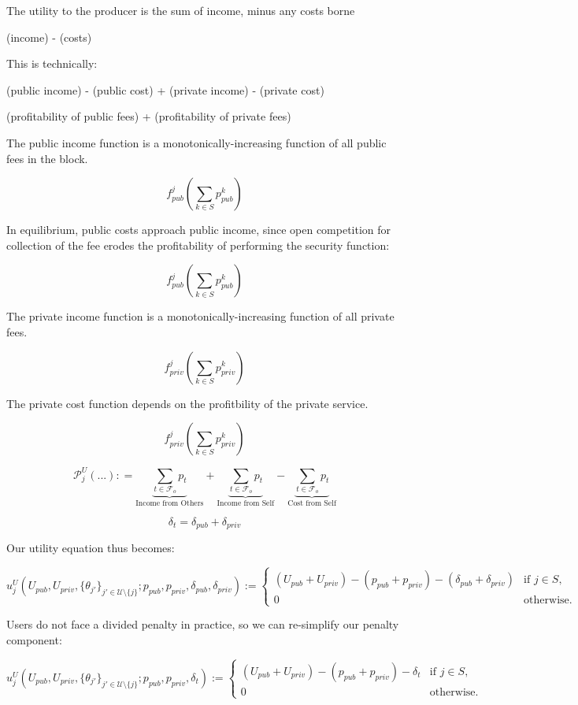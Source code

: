 \documentclass[oneside]{article}   	%
\begin{document}
The utility to the producer is the sum of income, minus any costs borne

(income) - (costs)


This is technically:

(public income) - (public cost) + (private income) - (private cost)

(profitability of public fees) + (profitability of private fees)

The public income function is a monotonically-increasing function of all public fees in the block.

$$
f_{pub}^j\left(\sum_{k \in S} p_{pub}^{k}\right)
$$

In equilibrium, public costs approach public income, since open competition for collection of the fee erodes the profitability of performing the security function:

$$
f_{pub}^j\left(\sum_{k \in S} p_{pub}^{k}\right)
$$

The private income function is a monotonically-increasing function of all private fees.

$$
f_{priv}^j\left(\sum_{k \in S} p_{priv}^{k}\right)
$$

The private cost function depends on the profitbility of the private service.

$$
f_{priv}^j\left(\sum_{k \in S} p_{priv}^{k}\right)
$$




\[
\mathcal{P}_{j}^U\left(...\right) : =
\underbrace{\sum_{t \in \mathcal{F}_o} p_t}_{\text{Income from Others}} + 
\underbrace{\sum_{t \in \mathcal{F}_o} p_t}_{\text{Income from Self}} -
\underbrace{\sum_{t \in \mathcal{F}_o} p_t}_{\text{Cost from Self}}
\]




$$
\delta_t = \delta_{pub} + \delta_{priv}
$$

Our utility equation thus becomes:

\[
u_j^U(U_{pub}, U_{priv}, \{\theta_{j'}\}_{j' \in \mathcal{U} \setminus \{j\}}; p_{pub}, p_{priv}, \delta_{pub}, \delta_{priv}) :=
\begin{cases}
(U_{pub} + U_{priv}) - (p_{pub} + p_{priv}) - (\delta_{pub} + \delta_{priv}) & \text{if } j \in S, \\
0 & \text{otherwise.}
\end{cases}
\]

Users do not face a divided penalty in practice, so we can re-simplify our penalty component:

\[
u_j^U(U_{pub}, U_{priv}, \{\theta_{j'}\}_{j' \in \mathcal{U} \setminus \{j\}}; p_{pub}, p_{priv}, \delta_t) :=
\begin{cases}
(U_{pub} + U_{priv}) - (p_{pub} + p_{priv}) - \delta_t & \text{if } j \in S, \\
0 & \text{otherwise.}
\end{cases}
\]
\end{document}
